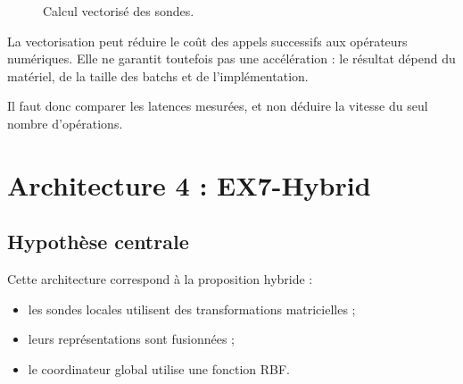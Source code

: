 \documentclass[11pt,a4paper]{article}
\begin{document}
\begin{figure}[H]
\centering
{}
\caption{Calcul vectorisé des sondes.}
\end{figure}

La vectorisation peut réduire le coût des appels successifs
aux opérateurs numériques. Elle ne garantit toutefois pas
une accélération : le résultat dépend du matériel, de la
taille des batchs et de l'implémentation.

Il faut donc comparer les latences mesurées, et non déduire
la vitesse du seul nombre d'opérations.

\section{Architecture 4 : EX7-Hybrid}

\subsection{Hypothèse centrale}

Cette architecture correspond à la proposition hybride :

\begin{itemize}
  \item les sondes locales utilisent des transformations
  matricielles ;
  \item leurs représentations sont fusionnées ;
  \item le coordinateur global utilise une fonction RBF.
\end{itemize}
\end{document}
